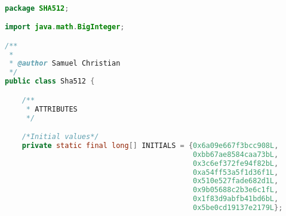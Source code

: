\begin{lstlisting}[language=Java,basicstyle=\tiny,caption=Sha512.java]

package SHA512;

import java.math.BigInteger;

/**
 *
 * @author Samuel Christian
 */
public class Sha512 {

    /**
     * ATTRIBUTES
     */

    /*Initial values*/
    private static final long[] INITIALS = {0x6a09e667f3bcc908L,
                                            0xbb67ae8584caa73bL,
                                            0x3c6ef372fe94f82bL,
                                            0xa54ff53a5f1d36f1L,
                                            0x510e527fade682d1L,
                                            0x9b05688c2b3e6c1fL,
                                            0x1f83d9abfb41bd6bL,
                                            0x5be0cd19137e2179L};


\end{lstlisting}
